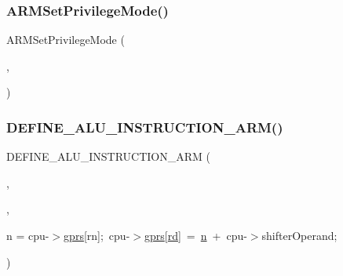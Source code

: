 \subsubsection{\texorpdfstring{A\+R\+M\+Set\+Privilege\+Mode()}{ARMSetPrivilegeMode()}\hspace{0.1cm}{\footnotesize\ttfamily [2/2]}}
{\footnotesize\ttfamily A\+R\+M\+Set\+Privilege\+Mode (\begin{DoxyParamCaption}\item[{cpu}]{,  }\item[{\mbox{\hyperlink{isa-arm_8c_a0aeea5daab02e6ee74a9948da77a56e5}{priv}}}]{ }\end{DoxyParamCaption})}

\mbox{\label{isa-arm_8c_aa0f4cf98349a134e8fcff4a89f78ac74}} 
\subsubsection{\texorpdfstring{D\+E\+F\+I\+N\+E\+\_\+\+A\+L\+U\+\_\+\+I\+N\+S\+T\+R\+U\+C\+T\+I\+O\+N\+\_\+\+A\+R\+M()}{DEFINE\_ALU\_INSTRUCTION\_ARM()}\hspace{0.1cm}{\footnotesize\ttfamily [1/6]}}
{\footnotesize\ttfamily D\+E\+F\+I\+N\+E\+\_\+\+A\+L\+U\+\_\+\+I\+N\+S\+T\+R\+U\+C\+T\+I\+O\+N\+\_\+\+A\+RM (\begin{DoxyParamCaption}\item[{A\+DD}]{,  }\item[{\mbox{\hyperlink{isa-arm_8c_a103147682143be92dabcad1fe5413934}{A\+R\+M\+\_\+\+A\+D\+D\+I\+T\+I\+O\+N\+\_\+S}}(\mbox{\hyperlink{isa-lr35902_8c_ae54e54065504090672c92ef62a1c5f05}{n}}, cpu-\/$>$shifter\+Operand, cpu-\/$>$\mbox{\hyperlink{isa-thumb_8c_a6b4b7e13a9a144391615b217c5917bc7}{gprs}}\mbox{[}\mbox{\hyperlink{isa-arm_8c_a555541ce18ed9b5fad657a06b22cb465}{rd}}\mbox{]})}]{,  }\item[{int32\+\_\+t}]{n = {\ttfamily cpu-\/$>$\mbox{\hyperlink{isa-thumb_8c_a6b4b7e13a9a144391615b217c5917bc7}{gprs}}\mbox{[}rn\mbox{]};~cpu-\/$>$\mbox{\hyperlink{isa-thumb_8c_a6b4b7e13a9a144391615b217c5917bc7}{gprs}}\mbox{[}\mbox{\hyperlink{isa-arm_8c_a555541ce18ed9b5fad657a06b22cb465}{rd}}\mbox{]}~=~\mbox{\hyperlink{isa-lr35902_8c_ae54e54065504090672c92ef62a1c5f05}{n}}~+~cpu-\/$>$shifterOperand;} }\end{DoxyParamCaption})}


